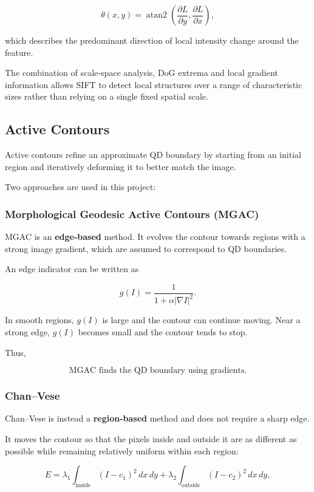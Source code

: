 \documentclass[11pt,a4paper]{article}
\begin{document}
\[
\theta(x,y)
=
\operatorname{atan2}
\left(
\frac{\partial L}{\partial y},
\frac{\partial L}{\partial x}
\right),
\]

which describes the predominant direction of local intensity change around the feature.

The combination of scale-space analysis, DoG extrema and local gradient information allows SIFT to detect local structures over a range of characteristic sizes rather than relying on a single fixed spatial scale.

\subsection{Active Contours}

Active contours refine an approximate QD boundary by starting from an initial region and iteratively deforming it to better match the image.

Two approaches are used in this project:

\subsubsection{Morphological Geodesic Active Contours (MGAC)}

MGAC is an \textbf{edge-based} method. It evolves the contour towards regions with a strong image gradient, which are assumed to correspond to QD boundaries.

An edge indicator can be written as

\[
g(I)=\frac{1}{1+\alpha |\nabla I|^2}.
\]

In smooth regions, \(g(I)\) is large and the contour can continue moving. Near a strong edge, \(g(I)\) becomes small and the contour tends to stop.

Thus,

\[
\boxed{\text{MGAC finds the QD boundary using gradients.}}
\]

\subsubsection{Chan--Vese}

Chan--Vese is instead a \textbf{region-based} method and does not require a sharp edge.

It moves the contour so that the pixels inside and outside it are as different as possible while remaining relatively uniform within each region:

\[
E =
\lambda_1 \int_{\mathrm{inside}} (I-c_1)^2\,dx\,dy
+
\lambda_2 \int_{\mathrm{outside}} (I-c_2)^2\,dx\,dy,
\]
\end{document}
